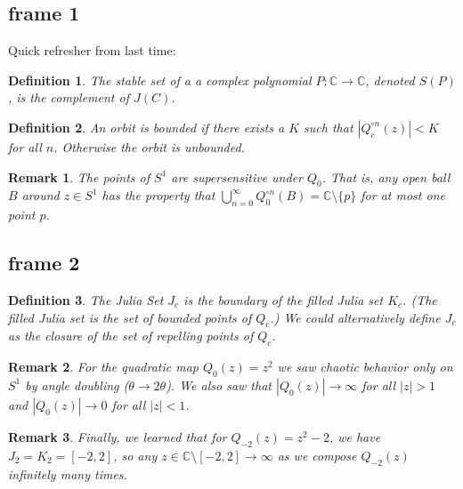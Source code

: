\documentclass[xcolor=x11names,compress]{beamer}
\renewcommand{\(}{\begin{columns}}
\renewcommand{\)}{\end{columns}}
\newcommand{\<}[1]{\begin{column}{#1}}
\renewcommand{\>}{\end{column}}
\newtheorem{defn}{Definition}
\newtheorem{rmk}{Remark}
\begin{document}
\subsection{frame 1}
\begin{frame}

Quick refresher from last time:

\pause

\begin{defn}
The \textsl{stable set} of a a complex polynomial $P: \mathbb{C} \rightarrow \mathbb{C}$, denoted $S(P)$, is the complement of $J(C)$.
\end{defn}

\pause

\begin{defn}
An orbit is \textsl{bounded} if there exists a $K$ such that $|Q_c^{\circ n}(z)| < K$ for all $n$. Otherwise the orbit is \textsl{unbounded}.
\end{defn}

\pause

\begin{rmk}
The points of $S^1$ are \textsl{supersensitive} under $Q_{0}$. That is, any open ball $B$ around $z \in S^1$ has the property that $\bigcup_{n=0}^\infty Q_0^{\circ n} (B) = \mathbb{C} \setminus \{p\}$ for at most one point $p$.
\end{rmk}

\end{frame}

\subsection{frame 2}
\begin{frame}

\begin{defn}
The Julia Set $J_c$ is the boundary of the filled Julia set $K_c$. (The filled Julia set is the set of bounded points of $Q_c$.) We could alternatively define $J_c$ as the closure of the set of repelling points of $Q_c$.
\end{defn}

\pause


\begin{rmk}
For the quadratic map $Q_0(z) = z^2$ we saw chaotic behavior only on $S^1$ by angle doubling ($\theta \rightarrow 2\theta$). We also saw that $|Q_0(z)| \rightarrow \infty$ for all $|z| > 1$ and $|Q_0(z)| \rightarrow 0$ for all $|z| < 1$.
\end{rmk}

\pause


\begin{rmk}
Finally, we learned that for $Q_{-2}(z) = z^2 - 2$, we have $J_2 = K_2 = [-2, 2]$, so any $z \in \mathbb{C} \setminus [-2,2] \rightarrow \infty$ as we compose $Q_{-2}(z)$ infinitely many times. 
\end{rmk}

\end{frame}
\end{document}
